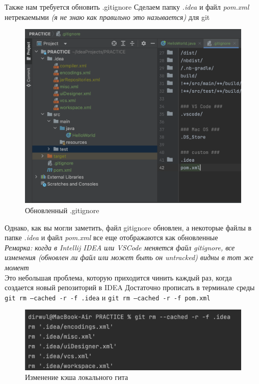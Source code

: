\documentclass[12pt, a4paper]{article}
\begin{document}
    Также нам требуется обновить .gitignore
    Сделаем папку \textit{.idea} и файл \textit{pom.xml} 
    нетрекаемыми \textit{(я не знаю как правильно это называется)} для git
    
    \begin{figure}[H]
        \centering
        \includegraphics[width=0.75\linewidth]{src/gitignore.png}
        \caption{Обновленный .gitignore}
    \end{figure}
    
    Однако, как вы могли заметить, файл gitignore обновлен, 
    а некоторые файлы в папке \textit{.idea} и файл \textit{pom.xml} все еще отображаются как обновленные\\
    
    \textit{Ремарка: когда в Intellij IDEA или VSCode меняется файл gitignore, все изменения 
    (обновлен ли файл или может быть он untracked) видны в тот же момент}\\

    Это небольшая проблема, которую приходится чинить каждый раз, когда создается новый репозиторий в IDEA
    Достаточно прописать в терминале среды \texttt{git rm --cached -r -f .idea} и \texttt{git rm --cached -r -f pom.xml}

    \begin{figure}[H]
        \centering
        \includegraphics[width=0.75\linewidth]{src/cached.png}
        \caption{Изменение кэша локального гита}
    \end{figure}
    
\end{document}

